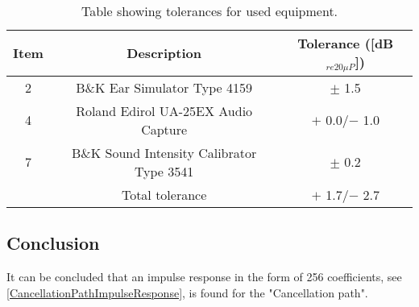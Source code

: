 \begin{table}[H]
	\centering
	\begin{tabular}{ c c c } \toprule
		{Item}	& 		{Description} 	& {Tolerance ([dB$_{re20\mu P}$])}	 \\ \bottomrule 
		2	&	B\&K Ear Simulator Type 4159				& $\pm$ 1.5 \cite{BK4159Tol} 	\\
		4	&	Roland Edirol UA-25EX Audio Capture			& $+$ 0.0/$-$ 1.0 \cite{UA25EXTol}	\\
		7	&	B\&K Sound Intensity Calibrator Type 3541	& $\pm$ 0.2	\cite{BK3541Tol} \\ \bottomrule
			&	Total tolerance								& $+$ 1.7/$-$ 2.7	\\ \bottomrule	
	\end{tabular}
	\caption{Table showing tolerances for used equipment.}
	\label{TolerancesCP}
\end{table}

\subsection{Conclusion}
It can be concluded that an impulse response in the form of 256 coefficients, see \autoref{CancellationPathImpulseResponse}, is found for the "Cancellation path". %

